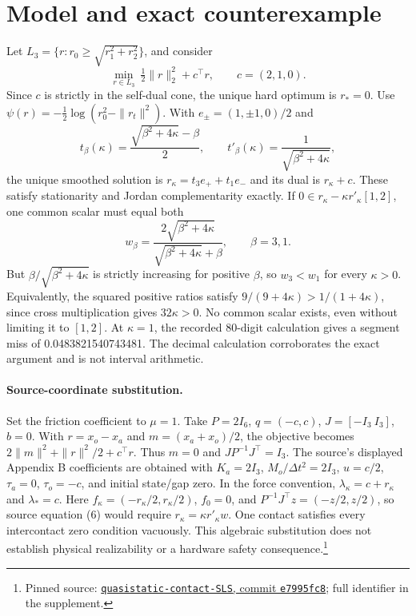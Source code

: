 \documentclass[10pt]{article}
\begin{document}
\section{Model and exact counterexample}
Let $L_3=\{r:r_0\geq\sqrt{r_1^2+r_2^2}\}$, and consider
\[
 \min_{r\in L_3}\ \tfrac12\|r\|_2^2+c^\top r,
 \qquad c=(2,1,0).
\]
Since $c$ is strictly in the self-dual cone, the unique hard optimum is $r_*=0$. Use $\psi(r)=-\tfrac12\log(r_0^2-\|r_t\|^2)$. With $e_\pm=(1,\pm1,0)/2$ and
\[
 t_\beta(\kappa)=\frac{\sqrt{\beta^2+4\kappa}-\beta}{2},
 \qquad t'_\beta(\kappa)=\frac1{\sqrt{\beta^2+4\kappa}},
\]
the unique smoothed solution is $r_\kappa=t_3e_++t_1e_-$ and its dual is $r_\kappa+c$. These satisfy stationarity and Jordan complementarity exactly. If $0\in r_\kappa-\kappa r'_\kappa[1,2]$, one common scalar must equal both
\[
 w_\beta=\frac{2\sqrt{\beta^2+4\kappa}}
 {\sqrt{\beta^2+4\kappa}+\beta},\qquad \beta=3,1.
\]
But $\beta/\sqrt{\beta^2+4\kappa}$ is strictly increasing for positive $\beta$, so $w_3<w_1$ for every $\kappa>0$. Equivalently, the squared positive ratios satisfy $9/(9+4\kappa)>1/(1+4\kappa)$, since cross multiplication gives $32\kappa>0$. No common scalar exists, even without limiting it to $[1,2]$. At $\kappa=1$, the recorded 80-digit calculation gives a segment miss of 0.0483821540743481. The decimal calculation corroborates the exact argument and is not interval arithmetic.

\paragraph{Source-coordinate substitution.}
Set the friction coefficient to $\mu=1$. Take $P=2I_6$, $q=(-c,c)$, $J=[-I_3\ I_3]$, $b=0$. With $r=x_o-x_a$ and $m=(x_a+x_o)/2$, the objective becomes $2\|m\|^2+\|r\|^2/2+c^\top r$. Thus $m=0$ and $JP^{-1}J^\top=I_3$. The source's displayed Appendix B coefficients are obtained with $K_a=2I_3$, $M_o/\Delta t^2=2I_3$, $u=c/2$, $\tau_a=0$, $\tau_o=-c$, and initial state/gap zero. In the force convention, $\lambda_\kappa=c+r_\kappa$ and $\lambda_*=c$. Here $f_\kappa=(-r_\kappa/2,r_\kappa/2)$, $f_0=0$, and $P^{-1}J^\top z=(-z/2,z/2)$, so source equation (6) would require $r_\kappa=\kappa r'_\kappa w$. One contact satisfies every intercontact zero condition vacuously. This algebraic substitution does not establish physical realizability or a hardware safety consequence.\footnote{Pinned source: \href{https://github.com/trustworthyrobotics/quasistatic-contact-SLS/tree/e7995fc8293ffd7d97047506b48ad948b9d35984}{\texttt{quasistatic-contact-SLS}, commit \texttt{e7995fc8}}; full identifier in the supplement.}
\end{document}
